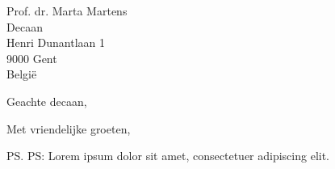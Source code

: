 \documentclass[language=nl,faculty=pp]{ugent-letter}
\begin{document}


\begin{letter}{
        Prof. dr. Marta Martens\\
        Decaan\\
        Henri Dunantlaan 1\\
        9000 Gent\\
        België
}

\opening{Geachte decaan,}

\lipsum[1-2]

\closing{Met vriendelijke groeten,}

\ps{PS: Lorem ipsum dolor sit amet, consectetuer adipiscing elit.}

\end{letter}
\end{document}
